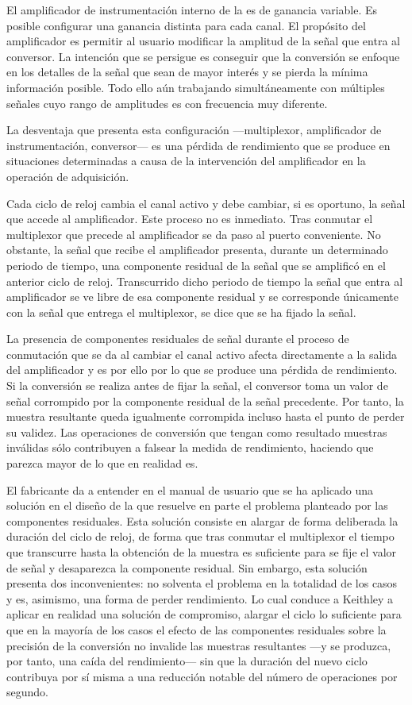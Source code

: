 El amplificador de instrumentación interno de la \kpci{} es de ganancia
variable. Es posible configurar una ganancia distinta para cada canal. El
propósito del amplificador es permitir al usuario modificar la amplitud de
la señal que entra al conversor. La intención que se persigue es conseguir
que la conversión se enfoque en los detalles de la señal que sean de mayor
interés y se pierda la mínima información posible. Todo ello aún trabajando
simultáneamente con múltiples señales cuyo rango de amplitudes es con
frecuencia muy diferente.

La desventaja que presenta esta configuración ---multiplexor, amplificador
de instrumentación, conversor--- es una pérdida de rendimiento que se
produce en situaciones determinadas a causa de la intervención del
amplificador en la operación de adquisición.

Cada ciclo de reloj cambia el canal activo y debe cambiar, si es oportuno,
la señal que accede al amplificador. Este proceso no es inmediato. Tras
conmutar el multiplexor que precede al amplificador se da paso al puerto
conveniente. No obstante, la señal que recibe el amplificador presenta,
durante un determinado periodo de tiempo, una componente residual de la
señal que se amplificó en el anterior ciclo de reloj. Transcurrido dicho
periodo de tiempo la señal que entra al amplificador se ve libre de esa
componente residual y se corresponde únicamente con la señal que entrega el
multiplexor, se dice que se ha fijado la señal.

La presencia de componentes residuales de señal durante el proceso de
conmutación que se da al cambiar el canal activo afecta directamente a la
salida del amplificador y es por ello por lo que se produce una pérdida de
rendimiento. Si la conversión se realiza antes de fijar la señal, el
conversor toma un valor de señal corrompido por la componente residual de
la señal precedente. Por tanto, la muestra resultante queda igualmente
corrompida incluso hasta el punto de perder su validez. Las operaciones de
conversión que tengan como resultado muestras inválidas sólo contribuyen a
falsear la medida de rendimiento, haciendo que parezca mayor de lo que en
realidad es.

El fabricante da a entender en el manual de usuario que se ha aplicado una
solución en el diseño de la \kpci{} que resuelve en parte el problema
planteado por las componentes residuales. Esta solución consiste en alargar
de forma deliberada la duración del ciclo de reloj, de forma que tras
conmutar el multiplexor el tiempo que transcurre hasta la obtención de la
muestra es suficiente para se fije el valor de señal y desaparezca la
componente residual. Sin embargo, esta solución presenta dos
inconvenientes: no solventa el problema en la totalidad de los casos y es,
asimismo, una forma de perder rendimiento. Lo cual conduce a Keithley a
aplicar en realidad una solución de compromiso, alargar el ciclo lo
suficiente para que en la mayoría de los casos el efecto de las componentes
residuales sobre la precisión de la conversión no invalide las muestras
resultantes ---y se produzca, por tanto, una caída del rendimiento--- sin
que la duración del nuevo ciclo contribuya por sí misma a una reducción
notable del número de operaciones por segundo.


